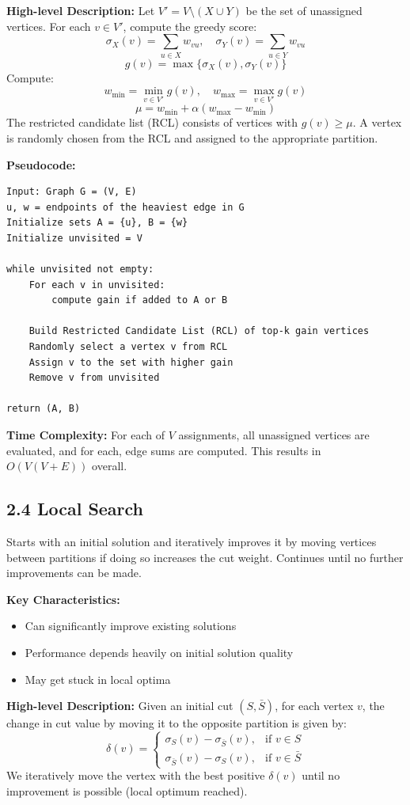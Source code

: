 \documentclass[11pt]{article}
\begin{document}
\textbf{High-level Description:}
Let $V' = V \setminus (X \cup Y)$ be the set of unassigned vertices. For each $v \in V'$, compute the greedy score:
\[ \sigma_X(v) = \sum_{u \in X} w_{vu}, \quad \sigma_Y(v) = \sum_{u \in Y} w_{vu} \]
\[ g(v) = \max\{ \sigma_X(v), \sigma_Y(v) \} \]
Compute:
\[ w_{\min} = \min_{v \in V'} g(v), \quad w_{\max} = \max_{v \in V'} g(v) \]
\[ \mu = w_{\min} + \alpha (w_{\max} - w_{\min}) \]
The restricted candidate list (RCL) consists of vertices with $g(v) \ge \mu$. A vertex is randomly chosen from the RCL and assigned to the appropriate partition.

\textbf{Pseudocode:}
\begin{verbatim}
Input: Graph G = (V, E)
u, w = endpoints of the heaviest edge in G
Initialize sets A = {u}, B = {w}
Initialize unvisited = V

while unvisited not empty:
    For each v in unvisited:
        compute gain if added to A or B

    Build Restricted Candidate List (RCL) of top-k gain vertices
    Randomly select a vertex v from RCL
    Assign v to the set with higher gain
    Remove v from unvisited

return (A, B)
\end{verbatim}

\textbf{Time Complexity:} For each of $V$ assignments, all unassigned vertices are evaluated, and for each, edge sums are computed. This results in $O(V(V+E))$ overall.

\subsection*{2.4 Local Search}
Starts with an initial solution and iteratively improves it by moving vertices between partitions if doing so increases the cut weight. Continues until no further improvements can be made.

\textbf{Key Characteristics:}
\begin{itemize}
\item Can significantly improve existing solutions
\item Performance depends heavily on initial solution quality
\item May get stuck in local optima
\end{itemize}

\textbf{High-level Description:}
Given an initial cut $(S, \bar{S})$, for each vertex $v$, the change in cut value by moving it to the opposite partition is given by:
\[ \delta(v) = \begin{cases} \sigma_S(v) - \sigma_{\bar{S}}(v), & \text{if } v \in S \\ \sigma_{\bar{S}}(v) - \sigma_S(v), & \text{if } v \in \bar{S} \end{cases} \]
We iteratively move the vertex with the best positive $\delta(v)$ until no improvement is possible (local optimum reached).
\end{document}
